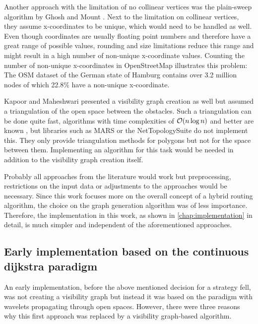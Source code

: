 		Another approach with the limitation of no collinear vertices was the plain-sweep algorithm by Ghosh and Mount \cite{ghosh-output-sensitive-vgraph}.
		Next to the limitation on collinear vertices, they assume x-coordinates to be unique, which would need to be handled as well.
		Even though coordinates are usually floating point numbers and therefore have a great range of possible values, rounding and size limitations reduce this range and might result in a high number of non-unique x-coordinate values.
		Counting the number of non-unique x-coordinates in OpenStreetMap illustrates this problem:
		The OSM dataset of the German state of Hamburg contains over 3.2 million nodes of which 22.8\% have a non-unique x-coordinate.
		
		Kapoor and Maheshwari presented a visibility graph creation as well \cite{kapoor-shortest-path-vgraph} but assumed a triangulation of the open space between the obstacles.
		Such a triangulation can be done quite fast, algorithms with time complexities of $\mathcal{O}(n \log{n})$ and better are known \cite[58-60]{de-berg-computational-geometry}, but libraries such as MARS or the NetTopologySuite do not implement this.
		They only provide triangulation methods for polygons but not for the space between them.
		Implementing an algorithm for this task would be needed in addition to the visibility graph creation itself.
		
		Probably all approaches from the literature would work but preprocessing, restrictions on the input data or adjustments to the approaches would be necessary.
		Since this work focuses more on the overall concept of a hybrid routing algorithm, the choice on the graph generation algorithm was of less importance.
		Therefore, the implementation in this work, as shown in \cref{chap:implementation} in detail, is much simpler and independent of the aforementioned approaches.
		
	\subsection{Early implementation based on the continuous dijkstra paradigm}
		
		An early implementation, before the above mentioned decision for a strategy fell, was not creating a visibility graph but instead it was based on the  paradigm with wavelets propagating through open spaces.
		However, there were three reasons why this first approach was replaced by a visibility graph-based algorithm.
		
